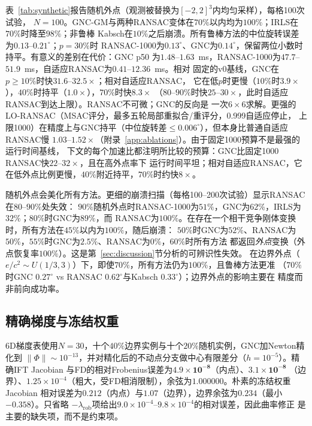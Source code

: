 表~\ref{tab:synthetic}报告随机外点（观测被替换为$[-2,2]^3$内均匀采样），每格100次试验，
$N=100$。GNC-GM与两种RANSAC变体在$70\%$以内均为$100\%$；IRLS在$70\%$时降至$98\%$；非鲁棒
Kabsch在$10\%$之后崩溃。所有鲁棒方法的中位旋转误差为$0.13$--$0.21^\circ$；$p=30\%$时
RANSAC-1000为$0.13^\circ$、GNC为$0.14^\circ$，保留两位小数时持平。有意义的差别在代价：GNC p50
为$1.48$--$1.63$~ms，RANSAC-1000为$47.7$--$51.9$~ms，自适应RANSAC为$0.41$--$12.36$~ms。相对
固定的v0基线，GNC在$p\ge10\%$时快$\mathbf{31.6}$--$\mathbf{32.5\times}$；相对自适应RANSAC，
它在低$p$时更慢（$10\%$时$3.9\times$），$40\%$时持平（$1.0\times$），$70\%$时快$8.3\times$
（$80$--$90\%$时快$25$--$30\times$，此时自适应RANSAC到达上限）。RANSAC不可微；GNC的反向是
一次$6\times6$求解。更强的LO-RANSAC（MSAC评分，最多五轮局部重拟合/重评分，0.999自适应停止，
上限1000）在精度上与GNC持平（中位旋转差$\le0.006^\circ$），但本身比普通自适应RANSAC慢
$1.03$--$1.52\times$（附录~\ref{app:ablations}）。由于固定1000预算不是最强的运行时间基线，
下文的每个加速比都注明所比较的预算：GNC比固定1000 RANSAC快$22$--$32\times$，且在高外点率下
运行时间平坦；相对自适应RANSAC，它在低外点比例更慢，$40\%$附近持平，$70\%$时约快$8\times$。

随机外点会美化所有方法。更细的崩溃扫描（每格100--200次试验）显示RANSAC在$80$--$90\%$处失效：
$90\%$随机外点时RANSAC-1000为$51\%$，GNC为$62\%$，IRLS为$32\%$；$80\%$时GNC为$89\%$，而
RANSAC为$100\%$。在存在一个相干竞争刚体变换时，所有方法在$45\%$以内为$100\%$，随后崩溃：
$50\%$时GNC为$52\%$、RANSAC为$50\%$，$55\%$时GNC为$2.5\%$、RANSAC为$0\%$，$60\%$时所有方法
都返回\emph{外点}变换（外点恢复率$100\%$）。这是第~\ref{sec:discussion}节分析的可辨识性失效。
在边界外点（$e/c^2\sim U(1/3,3)$）下，即使$70\%$，所有方法仍为$100\%$，且鲁棒方法更准
（$70\%$时GNC $0.27^\circ$ vs RANSAC $0.62^\circ$与Kabsch $0.33^\circ$）；边界外点的影响主要在
精度而非前向成功率。

\subsection{精确梯度与冻结权重}
\label{sec:gradient}

6D梯度表使用$N=30$，十个$40\%$边界实例与十个$20\%$随机实例，GNC加Newton精化到
$\|\Phi\|\sim10^{-13}$，并对精化后的不动点分支做中心有限差分（$h=10^{-5}$）。精确IFT Jacobian
与FD的相对Frobenius误差为$\mathbf{4.9\times10^{-8}}$（内点）、$\mathbf{3.1\times10^{-8}}$
（边界）、$1.25\times10^{-4}$（粗大，受FD相消限制），余弦为$1.000000$。朴素的冻结权重Jacobian
相对误差为$0.212$（内点）与$\mathbf{1.07}$（边界），边界余弦为$0.234$（最小$-0.358$）。只省略
$-\lambda_{\mathrm{rob}}$项给出$9.0\times10^{-4}$--$9.8\times10^{-4}$的相对误差，因此曲率修正
是主要的缺失项，而不是约束项。

